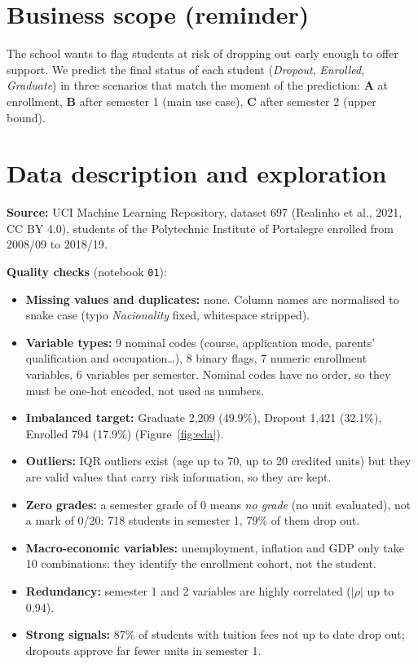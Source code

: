\documentclass[11pt,a4paper]{article}
\begin{document}
\section{Business scope (reminder)}
The school wants to flag students at risk of dropping out early enough to offer support. We predict the final status of each student (\textit{Dropout}, \textit{Enrolled}, \textit{Graduate}) in three scenarios that match the moment of the prediction: \textbf{A} at enrollment, \textbf{B} after semester 1 (main use case), \textbf{C} after semester 2 (upper bound).

\section{Data description and exploration}
\textbf{Source:} UCI Machine Learning Repository, dataset 697 (Realinho et al., 2021, CC BY 4.0), students of the Polytechnic Institute of Portalegre enrolled from 2008/09 to 2018/19.

\textbf{Quality checks} (notebook \texttt{01}):
\begin{itemize}
\item \textbf{Missing values and duplicates:} none. Column names are normalised to snake case (typo \textit{Nacionality} fixed, whitespace stripped).
\item \textbf{Variable types:} 9 nominal codes (course, application mode, parents' qualification and occupation\dots), 8 binary flags, 7 numeric enrollment variables, 6 variables per semester. Nominal codes have no order, so they must be one-hot encoded, not used as numbers.
\item \textbf{Imbalanced target:} Graduate 2,209 (49.9\%), Dropout 1,421 (32.1\%), Enrolled 794 (17.9\%) (Figure~\ref{fig:eda}).
\item \textbf{Outliers:} IQR outliers exist (age up to 70, up to 20 credited units) but they are valid values that carry risk information, so they are kept.
\item \textbf{Zero grades:} a semester grade of 0 means \textit{no grade} (no unit evaluated), not a mark of 0/20: 718 students in semester 1, 79\% of them drop out.
\item \textbf{Macro-economic variables:} unemployment, inflation and GDP only take 10 combinations: they identify the enrollment cohort, not the student.
\item \textbf{Redundancy:} semester 1 and 2 variables are highly correlated ($|\rho|$ up to 0.94).
\item \textbf{Strong signals:} 87\% of students with tuition fees not up to date drop out; dropouts approve far fewer units in semester 1.
\end{itemize}
\end{document}
